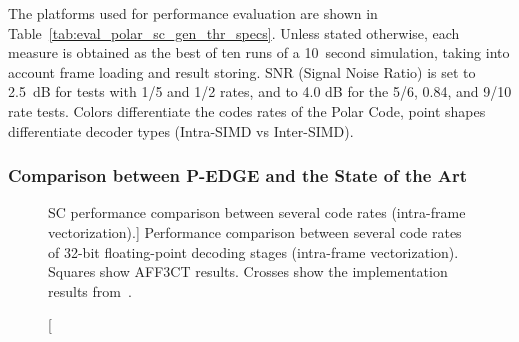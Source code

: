 The platforms used for performance evaluation are shown in
Table~\ref{tab:eval_polar_sc_gen_thr_specs}. Unless stated otherwise, each
measure is obtained as the best of ten runs of a 10~second simulation, taking
into account frame loading and result storing. SNR (Signal Noise Ratio) is set
to 2.5~dB for tests with 1/5 and 1/2 rates, and to 4.0 dB for the 5/6, 0.84, and
9/10 rate tests. Colors differentiate the codes rates of the Polar Code, point
shapes differentiate decoder types (Intra-SIMD vs Inter-SIMD).

\subsubsection{Comparison between P-EDGE and the State of the Art}

\begin{figure}[htp]
  \centering
  \quad
  \caption
    [SC performance comparison between several code rates (intra-frame
     vectorization).]
    {Performance comparison between several code rates of 32-bit floating-point
    decoding stages (intra-frame vectorization). Squares show AFF3CT results.
    Crosses show the implementation results from~\cite{Sarkis2014}.}
  \label{plot:eval_polar_sc_gen_thr_intra}
\end{figure}

